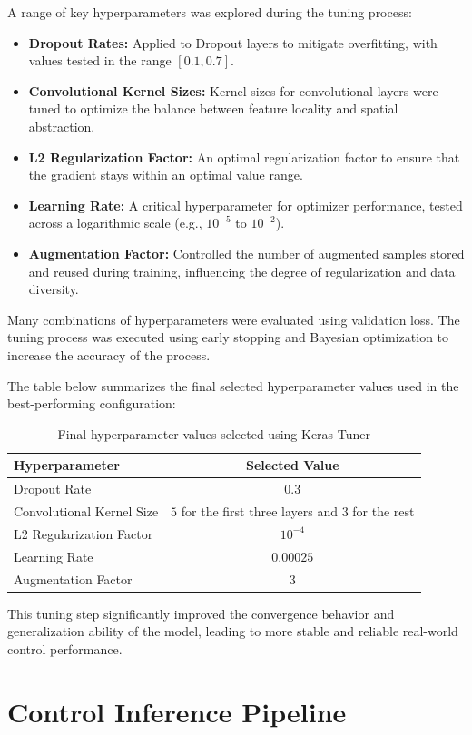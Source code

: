 A range of key hyperparameters was explored during the tuning process:

\begin{itemize}
  \item \textbf{Dropout Rates:} Applied to Dropout layers to mitigate overfitting, with values tested in the range \([0.1, 0.7]\).
  \item \textbf{Convolutional Kernel Sizes:} Kernel sizes for convolutional layers were tuned to optimize the balance between feature locality and spatial abstraction.
  \item \textbf{L2 Regularization Factor:} An optimal regularization factor to ensure that the gradient stays within an optimal value range.
  \item \textbf{Learning Rate:} A critical hyperparameter for optimizer performance, tested across a logarithmic scale (e.g., \(10^{-5}\) to \(10^{-2}\)).
  \item \textbf{Augmentation Factor:} Controlled the number of augmented samples stored and reused during training, influencing the degree of regularization and data diversity.
\end{itemize}

Many combinations of hyperparameters were evaluated using validation loss. The tuning process was executed using early stopping and Bayesian optimization to increase the accuracy of the process.

The table below summarizes the final selected hyperparameter values used in the best-performing configuration:

\begin{table}[H]
  \centering
  \begin{tabular}{|l|c|}
    \hline
    \textbf{Hyperparameter} & \textbf{Selected Value} \\
    \hline
    Dropout Rate & $0.3$ \\
    Convolutional Kernel Size & $5$ for the first three layers and $3$ for the rest \\
    L2 Regularization Factor & $10^{-4}$ \\
    Learning Rate & $0.00025$ \\
    Augmentation Factor & $3$ \\
    \hline
  \end{tabular}
  \caption{Final hyperparameter values selected using Keras Tuner}
  \label{tab:hyperparameters}
\end{table}

This tuning step significantly improved the convergence behavior and generalization ability of the model, leading to more stable and reliable real-world control performance.

\section{Control Inference Pipeline}
\label{sec:pipeline}

